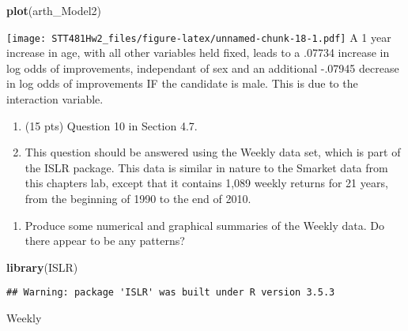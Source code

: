 \documentclass[]{article}
\newenvironment{Shaded}{\begin{snugshade}}{\end{snugshade}}
\newcommand{\KeywordTok}[1]{\textcolor[rgb]{0.13,0.29,0.53}{\textbf{#1}}}
\newcommand{\NormalTok}[1]{#1}
\providecommand{\tightlist}{%
  \setlength{\itemsep}{0pt}\setlength{\parskip}{0pt}}
\begin{document}
\begin{Shaded}
\begin{Highlighting}[]
\KeywordTok{plot}\NormalTok{(arth_Model2)}
\end{Highlighting}
\end{Shaded}

\texttt{[image: STT481Hw2\_files/figure-latex/unnamed-chunk-18-1.pdf]} A
1 year increase in age, with all other variables held fixed, leads to a
.07734 increase in log odds of improvements, independant of sex and an
additional -.07945 decrease in log odds of improvements IF the candidate
is male. This is due to the interaction variable.

\begin{enumerate}
\def\labelenumi{\arabic{enumi}.}
\setcounter{enumi}{7}
\item
  (15 pts) Question 10 in Section 4.7.
\item
  This question should be answered using the Weekly data set, which is
  part of the ISLR package. This data is similar in nature to the
  Smarket data from this chapters lab, except that it contains 1,089
  weekly returns for 21 years, from the beginning of 1990 to the end of
  2010.
\end{enumerate}

\begin{enumerate}
\def\labelenumi{(\alph{enumi})}
\tightlist
\item
  Produce some numerical and graphical summaries of the Weekly data. Do
  there appear to be any patterns?
\end{enumerate}

\begin{Shaded}
\begin{Highlighting}[]
\KeywordTok{library}\NormalTok{(ISLR)}
\end{Highlighting}
\end{Shaded}

\begin{verbatim}
## Warning: package 'ISLR' was built under R version 3.5.3
\end{verbatim}

\begin{Shaded}
\begin{Highlighting}[]
\NormalTok{Weekly}
\end{Highlighting}
\end{Shaded}
\end{document}
